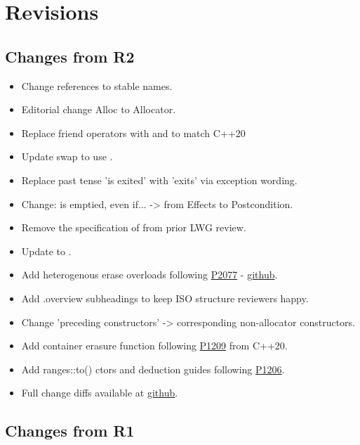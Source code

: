 \section{Revisions}

\subsection{Changes from R2}

\begin{itemize}
  \item Change references to stable names.
  \item Editorial change Alloc to Allocator.
  \item Replace friend operators with  and  to match C++20
  \item Update swap to use .
  \item Replace past tense 'is exited' with 'exits' via exception wording.
  \item {} Change:  is emptied, even if...  -> from Effects to Postcondition.
  \item Remove the specification of  from prior LWG review.
  \item Update  to .
  \item Add heterogenous erase overloads following \href{https://wg21.link/P2077}{P2077} - \href{https://github.com/tzlaine/flat_map/commit/a241df6b978479f0cc135ec567dbea4cd7407dd6}{github}.
  \item Add .overview subheadings to keep ISO structure reviewers happy.
  \item Change 'preceding constructors' -> corresponding non-allocator constructors.
  \item Add container erasure  function following \href{https://wg21.link/P1209}{P1209} from C++20.
  \item Add ranges::to() ctors and deduction guides following \href{https://wg21.link/P1206}{P1206}.
  \item Full change diffs available at \href{https://github.com/tzlaine/flat_map/commits/flat_set}{github}.
\end{itemize}

\subsection{Changes from R1}

